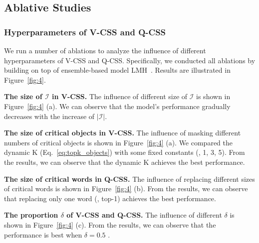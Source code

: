 \documentclass[10pt,twocolumn,letterpaper]{article}
\begin{document}
\subsection{Ablative Studies }
\subsubsection{Hyperparameters of V-CSS and Q-CSS}
We run a number of ablations to analyze the influence of different hyperparameters of V-CSS and Q-CSS. Specifically, we conducted all ablations by building on top of ensemble-based model LMH~\cite{clark2019don}. Results are illustrated in Figure~\ref{fig:4}.

\noindent\textbf{The size of $\mathcal{I}$ in V-CSS.} The influence of different size of $\mathcal{I}$ is shown in Figure~\ref{fig:4} (a). We can observe that the model's performance gradually decreases with the increase of $|\mathcal{I}|$. 

\noindent\textbf{The size of critical objects in V-CSS.} The influence of masking different numbers of critical objects is shown in Figure~\ref{fig:4} (a). We compared the dynamic K (Eq.~\eqref{eq:topk_objects}) with some fixed constants (\eg, 1, 3, 5). From the results, we can observe that the dynamic K achieves the best performance.

\noindent\textbf{The size of critical words in Q-CSS.} The influence of replacing different sizes of critical words is shown in Figure~\ref{fig:4} (b). From the results, we can observe that replacing only one word (\ie, top-1) achieves the best performance.

\noindent\textbf{The proportion $\delta$ of V-CSS and Q-CSS.} The influence of different $\delta$ is shown in Figure~\ref{fig:4} (c). From the results, we can observe that the performance is best when $\delta = 0.5$ .
\end{document}
